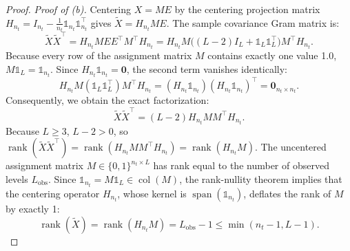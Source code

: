 \documentclass[default,sn-mathphys,Numbered]{sn-jnl}
\theoremstyle{thmstyleone}
\theoremstyle{thmstylethree}
\theoremstyle{thmstyletwo}
\newcommand{\rank}{\operatorname{rank}}
\begin{document}
\begin{appendices}
\begin{proof}
\textit{Proof of (b).}
Centering $X = M E$ by the centering projection matrix $H_{n_t} = I_{n_t} - \frac{1}{n_t} \mathds{1}_{n_t} \mathds{1}_{n_t}^\top$ gives $\tilde{X} = H_{n_t} M E$. The sample covariance Gram matrix is:
\begin{equation}
\tilde{X} \tilde{X}^\top = H_{n_t} M E E^\top M^\top H_{n_t} = H_{n_t} M \bigl((L - 2) I_L + \mathds{1}_L \mathds{1}_L^\top\bigr) M^\top H_{n_t}.
\end{equation}
Because every row of the assignment matrix $M$ contains exactly one value 1.0, $M \mathds{1}_L = \mathds{1}_{n_t}$.
Since $H_{n_t} \mathds{1}_{n_t} = \bm{0}$, the second term vanishes identically:
\begin{equation}
H_{n_t} M (\mathds{1}_L \mathds{1}_L^\top) M^\top H_{n_t} = (H_{n_t} \mathds{1}_{n_t}) (H_{n_t} \mathds{1}_{n_t})^\top = \bm{0}_{n_t \times n_t}.
\end{equation}
Consequently, we obtain the exact factorization:
\begin{equation}
\label{eq:appendix_centered_gram}
\tilde{X} \tilde{X}^\top = (L - 2) H_{n_t} M M^\top H_{n_t}.
\end{equation}
Because $L \ge 3$, $L - 2 > 0$, so $\rank(\tilde{X} \tilde{X}^\top) = \rank(H_{n_t} M M^\top H_{n_t}) = \rank(H_{n_t} M)$.
The uncentered assignment matrix $M \in \{0, 1\}^{n_t \times L}$ has rank equal to the number of observed levels $L_{\mathrm{obs}}$.
Since $\mathds{1}_{n_t} = M \mathds{1}_L \in \operatorname{col}(M)$, the rank-nullity theorem implies that the centering operator $H_{n_t}$, whose kernel is $\operatorname{span}(\mathds{1}_{n_t})$, deflates the rank of $M$ by exactly 1:
\begin{equation}
\rank(\tilde{X}) = \rank(H_{n_t} M) = L_{\mathrm{obs}} - 1 \le \min(n_t - 1, L - 1).
\end{equation}


\end{proof}
\end{appendices}
\end{document}
